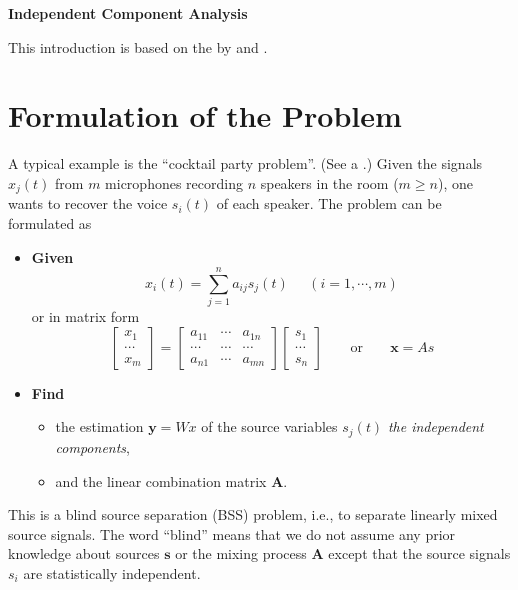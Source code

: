 \usepackage{html}

{\Large \bf Independent Component Analysis}

This introduction is based on the
 by  and .

\vskip 0.4in
\section*{Formulation of the Problem}

A typical example is the ``cocktail party problem''. (See a
.) Given
the signals $x_j(t)$ from $m$ microphones recording $n$ speakers in the
room ($m\ge n$), one wants to recover the voice $s_i(t)$ of each speaker.
The problem can be formulated as
\begin{itemize}
\item {\bf Given}
\[	x_i(t)=\sum_{j=1}^n a_{ij} s_j(t)\;\;\;\;\;(i=1,\cdots,m) \]
or in matrix form
\[	\left[ \begin{array}{c} x_1 \\ \cdots \\ x_m \end{array} \right]=
	\left[ \begin{array}{ccc} a_{11} & \cdots & a_{1n} \\
	\cdots & \cdots & \cdots \\ a_{n1} & \cdots & a_{mn}
\end{array} \right]
\left[ \begin{array}{c} s_1 \\ \cdots \\ s_n \end{array} \right]
\;\;\;\;\;\;\;\mbox{or}\;\;\;\;\;\;\;	{\mathbf x=As}	\]
\item {\bf Find}
\begin{itemize}
\item the estimation ${\mathbf y=Wx}$ of the source variables $s_j(t)$
	{\em the independent components},
\item and the linear combination matrix ${\mathbf A}$.
\end{itemize}
\end{itemize}
This is a blind source separation (BSS) problem, i.e., to separate
linearly mixed source signals. The word ``blind'' means that we do
not assume any prior knowledge about sources ${\mathbf s}$ or the mixing
process ${\mathbf A}$ except that the source signals $s_i$ are statistically
independent.

